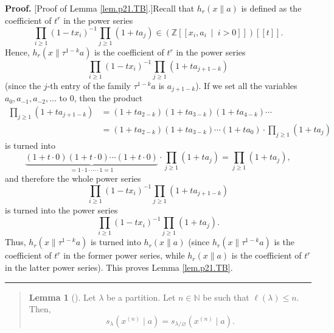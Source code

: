\documentclass[numbers=enddot,12pt,final,onecolumn,notitlepage]{scrartcl}%
\newenvironment{statement}{\begin{quote}}{\end{quote}}
\theoremstyle{definition}
\newtheorem{lem}[theo]{Lemma}
\newenvironment{lemmain}[1][]
{\begin{statement}\begin{lem}[#1]}
{\end{lem}\end{statement}}
\newenvironment{proof}[1][Proof]{\noindent\textbf{#1.} }{\ \rule{0.5em}{0.5em}}
\newenvironment{lemmain}[1][Proof]{\noindent\textbf{#1.} }{\ \rule{0.5em}{0.5em}}
\let\prodnonlimits\prod
\renewcommand{\prod}{\prodnonlimits\limits}
\begin{document}
\begin{enumerate}
\begin{proof}
[Proof of Lemma \ref{lem.p21.TB}.]Recall that $h_{r}\left(  x\parallel
a\right)  $ is defined as the coefficient of $t^{r}$ in the power series
\[
\prod_{i\geq1}\left(  1-tx_{i}\right)  ^{-1}\prod_{j\geq1}\left(
1+ta_{j}\right)  \in\left(  \mathbb{Z}\left[  \left[  x_{i},a_{i}%
\ \mid\ i>0\right]  \right]  \right)  \left[  \left[  t\right]  \right]  .
\]
Hence, $h_{r}\left(  x\parallel\tau^{1-k}a\right)  $ is the coefficient of
$t^{r}$ in the power series
\[
\prod_{i\geq1}\left(  1-tx_{i}\right)  ^{-1}\prod_{j\geq1}\left(
1+ta_{j+1-k}\right)
\]
(since the $j$-th entry of the family $\tau^{1-k}a$ is $a_{j+1-k}$). If we set
all the variables $a_{0},a_{-1},a_{-2},\ldots$ to $0$, then the product
\begin{align*}
\prod_{j\geq1}\left(  1+ta_{j+1-k}\right)   &  =\left(  1+ta_{2-k}\right)
\left(  1+ta_{3-k}\right)  \left(  1+ta_{4-k}\right)  \cdots\\
&  =\left(  1+ta_{2-k}\right)  \left(  1+ta_{3-k}\right)  \cdots\left(
1+ta_{0}\right)  \cdot\prod_{j\geq1}\left(  1+ta_{j}\right)
\end{align*}
is turned into
\[
\underbrace{\left(  1+t\cdot0\right)  \left(  1+t\cdot0\right)  \cdots\left(
1+t\cdot0\right)  }_{=1\cdot1\cdot\cdots\cdot1=1}\cdot\prod_{j\geq1}\left(
1+ta_{j}\right)  =\prod_{j\geq1}\left(  1+ta_{j}\right)  ,
\]
and therefore the whole power series%
\[
\prod_{i\geq1}\left(  1-tx_{i}\right)  ^{-1}\prod_{j\geq1}\left(
1+ta_{j+1-k}\right)
\]
is turned into the power series%
\[
\prod_{i\geq1}\left(  1-tx_{i}\right)  ^{-1}\prod_{j\geq1}\left(
1+ta_{j}\right)  .
\]
Thus, $h_{r}\left(  x\parallel\tau^{1-k}a\right)  $ is turned into
$h_{r}\left(  x\parallel a\right)  $ (since $h_{r}\left(  x\parallel\tau
^{1-k}a\right)  $ is the coefficient of $t^{r}$ in the former power series,
while $h_{r}\left(  x\parallel a\right)  $ is the coefficient of $t^{r}$ in
the latter power series). This proves Lemma \ref{lem.p21.TB}.
\end{proof}

\begin{lemmain}
\label{lem.p21.slam/0}Let $\lambda$ be a partition. Let $n\in\mathbb{N}$ be
such that $\ell\left(  \lambda\right)  \leq n$. Then,%
\[
s_{\lambda}\left(  x^{\left(  n\right)  }\mid a\right)  =s_{\lambda
/\varnothing}\left(  x^{\left(  n\right)  }\mid a\right)  .
\]

\end{lemmain}


\end{enumerate}
\end{document}
